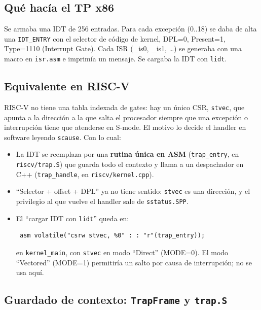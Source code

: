\subsection{Qué hacía el TP x86}

Se armaba una IDT de 256 entradas. Para cada excepción (0..18) se daba de alta una \texttt{IDT\_ENTRY} con el selector
de código de kernel, DPL=0, Present=1, Type=1110 (Interrupt Gate). Cada ISR (\_is0, \_is1, \ldots) se generaba con una
macro en \texttt{isr.asm} e imprimía un mensaje. Se cargaba la IDT con \texttt{lidt}.

\subsection{Equivalente en RISC-V}

RISC-V no tiene una tabla indexada de gates: hay un único CSR, \texttt{stvec}, que apunta a la dirección a la que salta
el procesador siempre que una excepción o interrupción tiene que atenderse en S-mode. El motivo lo decide el handler en
software leyendo \texttt{scause}. Con lo cual:

\begin{itemize}
  \item La IDT se reemplaza por una \textbf{rutina única en ASM} (\texttt{trap\_entry}, en \texttt{riscv/trap.S}) que
  guarda todo el contexto y llama a un despachador en C++ (\texttt{trap\_handle}, en \texttt{riscv/kernel.cpp}).
  \item ``Selector + offset + DPL'' ya no tiene sentido: \texttt{stvec} es una dirección, y el privilegio al que vuelve
  el handler sale de \texttt{sstatus.SPP}.
  \item El ``cargar IDT con \texttt{lidt}'' queda en:
\begin{codesnippet}
\begin{verbatim}
 asm volatile("csrw stvec, %0" : : "r"(trap_entry));
\end{verbatim}
\end{codesnippet}
  en \texttt{kernel\_main}, con \texttt{stvec} en modo ``Direct'' (MODE=0). El modo ``Vectored'' (MODE=1) permitiría un
  salto por causa de interrupción; no se usa aquí.
\end{itemize}

\subsection{Guardado de contexto: \texttt{TrapFrame} y \texttt{trap.S}}

